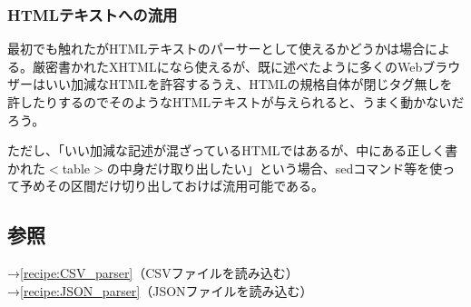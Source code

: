 \subsubsection*{HTMLテキストへの流用}

最初でも触れたがHTMLテキストのパーサーとして使えるかどうかは場合による。厳密書かれたXHTMLになら使えるが、既に述べたように多くのWebブラウザーはいい加減なHTMLを許容するうえ、HTMLの規格自体が閉じタグ無しを許したりするのでそのようなHTMLテキストが与えられると、うまく動かないだろう。

ただし、「いい加減な記述が混ざっているHTMLではあるが、中にある正しく書かれた$<$table$>$の中身だけ取り出したい」という場合、sedコマンド等を使って予めその区間だけ切り出しておけば流用可能である。

\subsection*{参照}

\noindent
→\ref{recipe:CSV_parser}（CSVファイルを読み込む） \\
→\ref{recipe:JSON_parser}（JSONファイルを読み込む）
